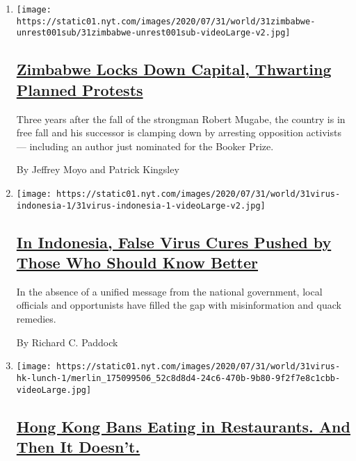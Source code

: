 \begin{enumerate}
\def\labelenumi{\arabic{enumi}.}
\item
  \texttt{[image: https://static01.nyt.com/images/2020/07/31/world/31zimbabwe-unrest001sub/31zimbabwe-unrest001sub-videoLarge-v2.jpg]}

  \hypertarget{zimbabwe-locks-down-capital-thwarting-planned-protests}{%
  \subsection{\texorpdfstring{\href{/2020/07/31/world/africa/zimbabwe-coronavirus-protest.html}{Zimbabwe
  Locks Down Capital, Thwarting Planned
  Protests}}{Zimbabwe Locks Down Capital, Thwarting Planned Protests}}\label{zimbabwe-locks-down-capital-thwarting-planned-protests}}

  Three years after the fall of the strongman Robert Mugabe, the country
  is in free fall and his successor is clamping down by arresting
  opposition activists --- including an author just nominated for the
  Booker Prize.

  By Jeffrey Moyo and Patrick Kingsley
\item
  \texttt{[image: https://static01.nyt.com/images/2020/07/31/world/31virus-indonesia-1/31virus-indonesia-1-videoLarge-v2.jpg]}

  \hypertarget{in-indonesia-false-virus-cures-pushed-by-those-who-should-know-better}{%
  \subsection{\texorpdfstring{\href{/2020/07/31/world/asia/indonesia-coronavirus.html}{In
  Indonesia, False Virus Cures Pushed by Those Who Should Know
  Better}}{In Indonesia, False Virus Cures Pushed by Those Who Should Know Better}}\label{in-indonesia-false-virus-cures-pushed-by-those-who-should-know-better}}

  In the absence of a unified message from the national government,
  local officials and opportunists have filled the gap with
  misinformation and quack remedies.

  By Richard C. Paddock
\item
  \texttt{[image: https://static01.nyt.com/images/2020/07/31/world/31virus-hk-lunch-1/merlin\_175099506\_52c8d8d4-24c6-470b-9b80-9f2f7e8c1cbb-videoLarge.jpg]}

  \hypertarget{hong-kong-bans-eating-in-restaurants-and-then-it-doesnt}{%
  \subsection{\texorpdfstring{\href{/2020/07/31/world/asia/hongkong-dining-lunch-coronavirus.html}{Hong
  Kong Bans Eating in Restaurants. And Then It
  Doesn't.}}{Hong Kong Bans Eating in Restaurants. And Then It Doesn't.}}\label{hong-kong-bans-eating-in-restaurants-and-then-it-doesnt}}


\end{enumerate}
